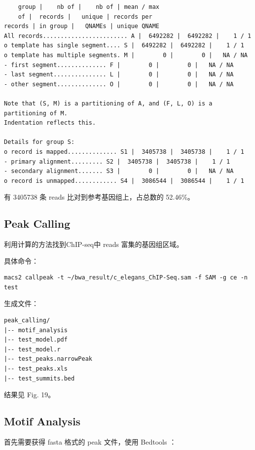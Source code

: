\documentclass[UTF8]{ctexart}
\begin{document}
\begin{lstlisting}
	group |    nb of |    nb of | mean / max
	of |  records |   unique | records per
records | in group |   QNAMEs | unique QNAME
All records........................ A |  6492282 |  6492282 |    1 / 1
o template has single segment.... S |  6492282 |  6492282 |    1 / 1
o template has multiple segments. M |        0 |        0 |   NA / NA
- first segment.............. F |        0 |        0 |   NA / NA
- last segment............... L |        0 |        0 |   NA / NA
- other segment.............. O |        0 |        0 |   NA / NA

Note that (S, M) is a partitioning of A, and (F, L, O) is a partitioning of M.
Indentation reflects this.

Details for group S:
o record is mapped.............. S1 |  3405738 |  3405738 |    1 / 1
- primary alignment......... S2 |  3405738 |  3405738 |    1 / 1
- secondary alignment....... S3 |        0 |        0 |   NA / NA
o record is unmapped............ S4 |  3086544 |  3086544 |    1 / 1
\end{lstlisting}

有 3405738 条 reads 比对到参考基因组上，占总数的 52.46\%。

\subsection{Peak Calling}

利用计算的方法找到ChIP-seq中 reads 富集的基因组区域。

具体命令：

\begin{lstlisting}
macs2 callpeak -t ~/bwa_result/c_elegans_ChIP-Seq.sam -f SAM -g ce -n test
\end{lstlisting}

生成文件：

\begin{lstlisting}
peak_calling/
|-- motif_analysis
|-- test_model.pdf
|-- test_model.r
|-- test_peaks.narrowPeak
|-- test_peaks.xls
|-- test_summits.bed
\end{lstlisting}

结果见 Fig. 19。


\subsection{Motif Analysis}

首先需要获得 fasta 格式的 peak 文件，使用 Bedtools ：
\end{document}
